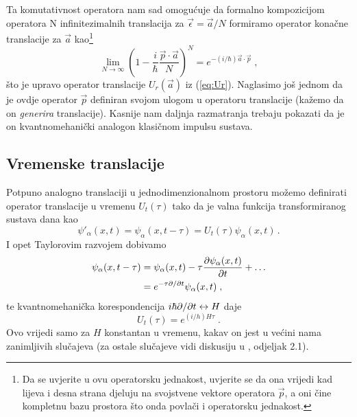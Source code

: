 Ta komutativnost operatora nam sad omogućuje da formalno kompozicijom
operatora N infinitezimalnih translacija za $\vec{\epsilon} = \vec{a}/N$ formiramo 
operator konačne translacije za $\vec{a}$ kao\footnote{Da se uvjerite u ovu
    operatorsku jednakost, uvjerite se da ona vrijedi kad lijeva i desna
    strana djeluju na svojstvene vektore operatora $\vec{p}$, a oni
    čine kompletnu bazu prostora što onda povlači i operatorsku jednakost.}
\begin{equation}
    \lim_{N\to\infty} \left(1 - \frac{i}{\hbar} \frac{\vec{p}\cdot\vec{a}}{N} \right)^N
        = e^{-(i/\hbar)\vec{a}\cdot\vec{p}} \;,
\end{equation}
što je upravo operator translacije $U_r(\vec{a})$ iz (\ref{eq:Ur}).
Naglasimo još jednom da je ovdje operator $\vec{p}$ definiran svojom ulogom
u operatoru translacije (kažemo da on \emph{generira} translacije). 
Kasnije nam daljnja razmatranja trebaju pokazati
da je on kvantnomehanički analogon klasičnom impulsu sustava.


\subsection{Vremenske translacije}
\label{vremensketranslacije}

Potpuno analogno translaciji u jednodimenzionalnom prostoru
možemo definirati operator translacije u vremenu $U_{t}(\tau)$
tako da je valna funkcija transformiranog sustava dana kao
\begin{equation}
 \psi'_{\alpha}(x,t) = \psi_{\alpha}(x,t-\tau) = U_{t}(\tau)\psi_{\alpha}(x,t)\,.
\end{equation}
I opet Taylorovim razvojem dobivamo
\begin{equation}
\begin{split}
 \psi_{\alpha}(x,t-\tau)&=\psi_{\alpha}(x,t)-\tau\frac{\partial\psi_{\alpha}(x,t)}
{\partial t}+\ldots \\
&=e^{-\tau \partial / \partial  t} \psi_{\alpha}(x,t) \;,
\end{split}
\end{equation}
te kvantnomehanička korespondencija $i\hbar\partial /\partial t \leftrightarrow H$
daje
\begin{equation}
U_t(\tau)= e^{(i/h)H\tau} \;.
\end{equation}
Ovo vrijedi samo za $H$ konstantan u vremenu, kakav on jest u većini
nama zanimljivih slučajeva (za ostale slučajeve
vidi diskusiju u \cite{Sakurai:2011}, odjeljak 2.1).

